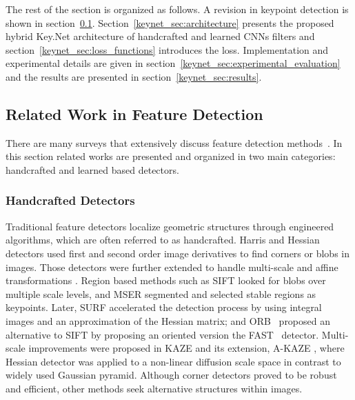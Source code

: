 \noindent The rest of the section is organized as follows. A revision in keypoint detection is shown in section~\ref{keynet_sec:related_work}. Section~\ref{keynet_sec:architecture} presents the proposed hybrid Key.Net architecture of handcrafted and learned CNNs filters and section~\ref{keynet_sec:loss_functions} introduces the loss. Implementation and experimental details are given in section~\ref{keynet_sec:experimental_evaluation} and the results are presented in section~\ref{keynet_sec:results}.


\subsection{Related Work in Feature Detection}
\label{keynet_sec:related_work}

There are many surveys that extensively discuss feature detection methods~\cite{Karel_Vedaldi_BMVC_18, TuytelaarsMikolajczyk2007}. 
In this section related works are presented and organized in two main categories: handcrafted and learned based detectors. 


\subsubsection{Handcrafted Detectors}
Traditional feature detectors localize geometric structures through engineered algorithms, which are often referred to as handcrafted. Harris \cite{Harris} and Hessian \cite{Hessian} detectors used first and second order image derivatives to find corners or blobs in images. Those detectors were further extended to handle multi-scale and affine transformations \cite{mikolajczykIJCV2004, comparasionofdetector}. Region based methods such as SIFT \cite{SIFT} looked for blobs over multiple scale levels, and MSER \cite{MSER} segmented and selected stable regions as keypoints. Later, SURF \cite{SURF} accelerated the detection process by using integral images and an approximation of the Hessian matrix; and ORB~\cite{ORB} proposed an alternative to SIFT by proposing an oriented version the FAST~\cite{FAST} detector. Multi-scale improvements were proposed in KAZE \cite{KAZE} and its extension, A-KAZE \cite{AKAZE}, where Hessian detector was applied to a non-linear diffusion scale space in contrast to widely used Gaussian pyramid. Although corner detectors proved to be robust and efficient, other methods seek alternative structures within images.

